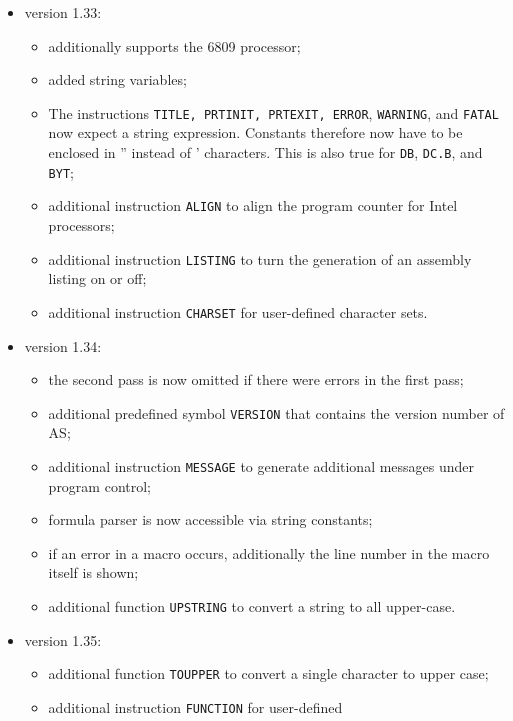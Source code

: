 \documentclass[12pt,twoside]{report}
\newcommand{\tty}[1]{{\tt #1}}
\begin{document}
\begin{itemize}
{\begin{itemize}
      \end{itemize}}
\item{version 1.33:
      \begin{itemize}
      \item{additionally supports the 6809 processor;}
      \item{added string variables;}
      \item{The instructions \tty{TITLE, PRTINIT, PRTEXIT, ERROR},
            \tty{WARNING}, and \tty{FATAL} now expect a string expression.
            Constants therefore now have to be enclosed in 
            '' instead of ' characters.  This is also true
            for \tty{DB}, \tty{DC.B}, and \tty{BYT};}
      \item{additional instruction \tty{ALIGN} to align the program
            counter for Intel processors;}
      \item{additional instruction \tty{LISTING} to turn the generation
            of an assembly listing on or off;}
      \item{additional instruction \tty{CHARSET} for user-defined 
            character sets.}
      \end{itemize}}
\item{version 1.34:
      \begin{itemize}
      \item{the second pass is now omitted if there were errors
            in the first pass;}
      \item{additional predefined symbol \tty{VERSION} that contains
            the version number of AS;}
      \item{additional instruction \tty{MESSAGE} to generate additional
            messages under program control;}
      \item{formula parser is now accessible via string constants;}
      \item{if an error in a macro occurs, additionally the line
            number in the macro itself is shown;}
      \item{additional function \tty{UPSTRING} to convert a string to
            all upper-case.}
      \end{itemize}}
\item{version 1.35:
      \begin{itemize}
      \item{additional function \tty{TOUPPER} to convert a single 
            character to upper case;}
      \item{additional instruction \tty{FUNCTION} for user-defined
}
\end{itemize}}
\end{itemize}
\end{document}

